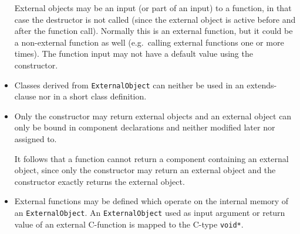 \begin{itemize}
\begin{nonnormative}
  \end{nonnormative}
  \begin{nonnormative}
  External objects may be an input (or part of an input) to a function, in that case the destructor is not called (since the external object is active before
  and after the function call).  Normally this is an external function, but it could be a non-external function as well (e.g.\ calling external functions one
  or more times).  The function input may not have a default value using the constructor.
  \end{nonnormative}
\item
  Classes derived from \lstinline!ExternalObject! can neither be used in an
  extends-clause nor in a short class definition.
\item
  Only the constructor may return external objects and an external object
  can only be bound in component declarations and neither modified later
  nor assigned to.
  \begin{nonnormative}
  It follows that a function cannot return a component containing an external object, since only the constructor may return an external object and the constructor exactly returns the external object.
  \end{nonnormative}
\item
  External functions may be defined which operate on the internal memory
  of an \lstinline!ExternalObject!. An \lstinline!ExternalObject! used as input argument or
  return value of an external C-function is mapped to the C-type
  \lstinline!void*!.
\end{itemize}

